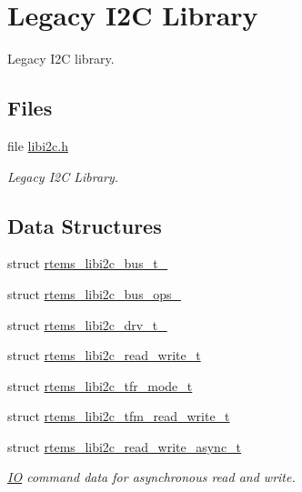 \hypertarget{group__libi2c}{}\section{Legacy I2C Library}
\label{group__libi2c}


Legacy I2C library.  


\subsection*{Files}
\begin{DoxyCompactItemize}
\item 
file \mbox{\hyperlink{libi2c_8h}{libi2c.\+h}}
\begin{DoxyCompactList}\small\item\em Legacy I2C Library. \end{DoxyCompactList}\end{DoxyCompactItemize}
\subsection*{Data Structures}
\begin{DoxyCompactItemize}
\item 
struct \mbox{\hyperlink{structrtems__libi2c__bus__t__}{rtems\+\_\+libi2c\+\_\+bus\+\_\+t\+\_\+}}
\item 
struct \mbox{\hyperlink{structrtems__libi2c__bus__ops__}{rtems\+\_\+libi2c\+\_\+bus\+\_\+ops\+\_\+}}
\item 
struct \mbox{\hyperlink{structrtems__libi2c__drv__t__}{rtems\+\_\+libi2c\+\_\+drv\+\_\+t\+\_\+}}
\item 
struct \mbox{\hyperlink{structrtems__libi2c__read__write__t}{rtems\+\_\+libi2c\+\_\+read\+\_\+write\+\_\+t}}
\item 
struct \mbox{\hyperlink{structrtems__libi2c__tfr__mode__t}{rtems\+\_\+libi2c\+\_\+tfr\+\_\+mode\+\_\+t}}
\item 
struct \mbox{\hyperlink{structrtems__libi2c__tfm__read__write__t}{rtems\+\_\+libi2c\+\_\+tfm\+\_\+read\+\_\+write\+\_\+t}}
\item 
struct \mbox{\hyperlink{structrtems__libi2c__read__write__async__t}{rtems\+\_\+libi2c\+\_\+read\+\_\+write\+\_\+async\+\_\+t}}
\begin{DoxyCompactList}\small\item\em \mbox{\hyperlink{structIO}{IO}} command data for asynchronous read and write. \end{DoxyCompactList}\end{DoxyCompactItemize}
